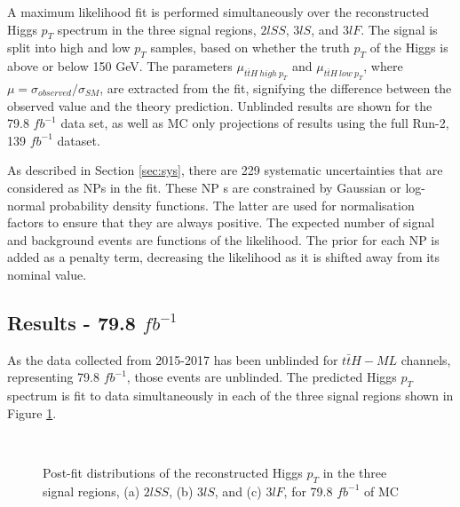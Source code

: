 A maximum likelihood fit is performed simultaneously over the reconstructed Higgs $p_T$ spectrum in the three signal regions, $2lSS$, $3lS$, and $3lF$. The signal is split into high and low $p_T$ samples, based on whether the truth $p_T$ of the Higgs is above or below 150 GeV. The parameters $\mu_{t\bar{t}H\ high\ p_T}$ and $\mu_{t\bar{t}H\ low\ p_T}$, where $\mu = \sigma_{observed}/\sigma_{SM} $, are extracted from the fit, signifying the difference between the observed value and the theory prediction. Unblinded results are shown for the 79.8 $fb^{-1}$ data set, as well as MC only projections of results using the full Run-2, 139 $fb^{-1}$ dataset.

As described in Section \ref{sec:sys}, there are 229 systematic uncertainties that are considered as NPs in the fit. These NP s are constrained by Gaussian or log-normal probability density functions. The latter are used for normalisation factors to ensure that they are always positive. The expected number of signal and background events are functions of the likelihood. The prior for each NP is added as a penalty term, decreasing the likelihood as it is shifted away from its nominal value.

\subsection{Results - 79.8 $fb^{-1}$}
\label{sec:res80}

As the data collected from 2015-2017 has been unblinded for $t\bar{t}H-ML$ channels, representing 79.8 $fb^{-1}$, those events are unblinded. The predicted Higgs $p_T$ spectrum is fit to data simultaneously in each of the three signal regions shown in Figure \ref{fig:sigRegions80}.

\begin{figure}[H]
    \centering
    \\
    \caption{Post-fit distributions of the reconstructed Higgs $p_T$ in the three signal regions, (a) $2lSS$, (b) $3lS$, and (c) $3lF$, for 79.8 $fb^{-1}$ of MC}
    \label{fig:sigRegions80}
\end{figure}

